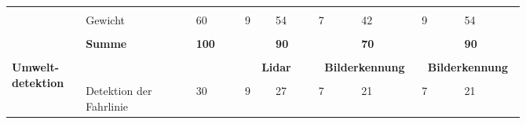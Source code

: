 \documentclass[main.tex]{subfiles} %
\begin{document}
\begin{landscape}
\begin{table}[H]
\begin{tabular}{|p{0.11\linewidth}|p{0.18\linewidth}|p{0.085\linewidth}|p{0.057\linewidth}|p{0.07\linewidth}|p{0.057\linewidth}|p{0.07\linewidth}|p{0.057\linewidth}|p{0.07\linewidth}|}
            \cline{2-9}
                                                           &                                     &                                            &                                             &                                             &   &               &   &             \\[-9pt]
                                                           & Gewicht                             & 60                                         & 9                                           & 54                                          & 7 & 42            & 9 & 54          \\[1pt]
            \cline{2-9}
                                                           &                                     &                                            &                                             &                                             &   &               &   &             \\[-9pt]
                                                           & \textbf{Summe}                      & \textbf{100}                               &                                             & \textbf{90}                                 &   & \textbf{70}   &   & \textbf{90} \\[1pt]
            \hline
            \hline
                                                           & \multicolumn{2}{c|}{}               & \multicolumn{2}{c|}{}                      & \multicolumn{2}{c|}{}                       & \multicolumn{2}{c|}{}                                                             \\[-9pt]
            \multirow{6}{4em}{\textbf{Umwelt-detektion}}   & \multicolumn{2}{c|}{}               & \multicolumn{2}{c|}{\textbf{Lidar}}        & \multicolumn{2}{c|}{\textbf{Bilderkennung}} & \multicolumn{2}{c|}{\textbf{Bilderkennung}}                                       \\[1pt]
            \cline{2-9}
                                                           &                                     &                                            &                                             &                                             &   &               &   &             \\[-9pt]
                                                           & Detektion der Fahrlinie             & 30                                         & 9                                           & 27                                          & 7 & 21            & 7 & 21          \\[1pt]

\end{tabular}
\end{table}
\end{landscape}
\end{document}

